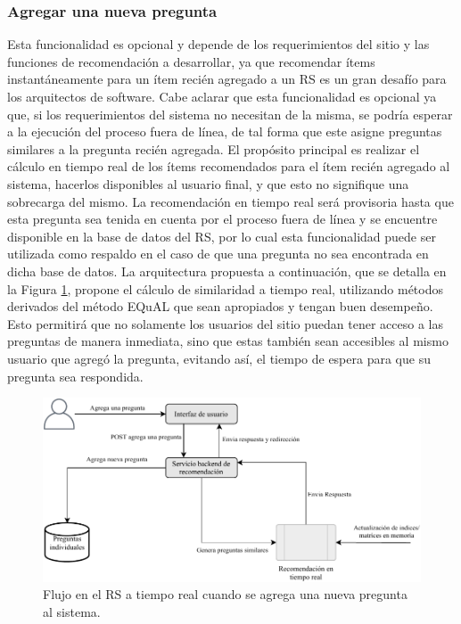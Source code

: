 \subsubsection{Agregar una nueva pregunta}\label{sec:implementacion_rs_agregar}
Esta funcionalidad es opcional y depende de los requerimientos del sitio y las funciones de recomendación a desarrollar, ya que recomendar ítems instantáneamente para un ítem recién agregado a un RS es un gran desafío para los arquitectos de software. Cabe aclarar que esta funcionalidad es opcional ya que, si los requerimientos del sistema no necesitan de la misma, se podría esperar a la ejecución del proceso fuera de línea, de tal forma que este asigne preguntas similares a la pregunta recién agregada. El propósito principal es realizar el cálculo en tiempo real de los ítems recomendados para el ítem recién agregado al sistema, hacerlos disponibles al usuario final, y que esto no signifique una sobrecarga del mismo. La recomendación en tiempo real será provisoria hasta que esta pregunta sea tenida en cuenta por el proceso fuera de línea y se encuentre disponible en la base de datos del RS, por lo cual esta funcionalidad puede ser utilizada como respaldo en el caso de que una pregunta no sea encontrada en dicha base de datos. La arquitectura propuesta a continuación, que se detalla en la Figura \ref{fig:implementacionrsagregar}, propone el cálculo de similaridad a tiempo real, utilizando métodos derivados del método EQuAL que sean apropiados y tengan buen desempeño. Esto permitirá que no solamente los usuarios del sitio puedan tener acceso a las preguntas de manera inmediata, sino que estas también sean accesibles al mismo usuario que agregó la pregunta, evitando así, el tiempo de espera para que su pregunta sea respondida.

\begin{figure}[h!]
	\centering
	\includegraphics[width=0.9\linewidth]{8_problema_investigacion/imagenes/implementacion_rs_agregar}
	\caption{Flujo en el RS a tiempo real cuando se agrega una nueva pregunta al sistema.}
	\label{fig:implementacionrsagregar}
\end{figure}

